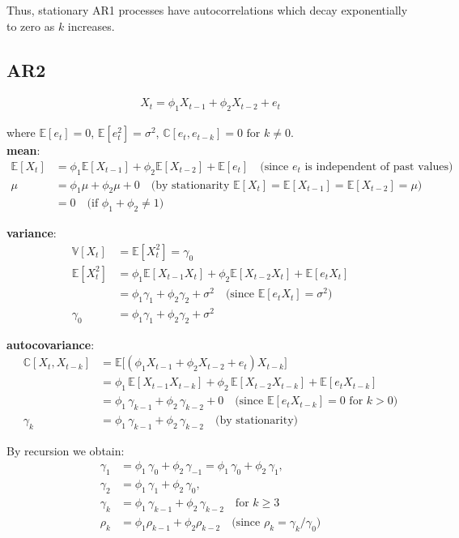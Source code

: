 \documentclass[docs/main.tex]{subfiles}
\begin{document}
Thus, stationary AR1 processes have autocorrelations which decay exponentially to zero as $k$ increases.


\subsection*{AR2}

\begin{align}
    X_t = \phi_1 X_{t-1} + \phi_2 X_{t-2} + e_t \label{eq:ar2-1}
\end{align}

where $\mathbb{E}[e_t] = 0$, $\mathbb{E}[e_t^2] = \sigma^2$, $\mathbb{C}[e_t, e_{t-k}] = 0\text{ for }k\ne0$.\\

\textbf{mean}:
\begin{align}
    \mathbb{E}[X_t] &= \phi_1\mathbb{E}[X_{t-1}] + \phi_2\mathbb{E}[X_{t-2}] + \mathbb{E}[e_t] \quad\text{(since $e_t$ is independent of past values)}\\
    \mu &= \phi_1 \mu + \phi_2 \mu + 0 \quad\text{(by stationarity $\mathbb{E}[X_t]=\mathbb{E}[X_{t-1}]
    =\mathbb{E}[X_{t-2}]=\mu$)}\\
    &= 0 \quad\text{(if $\phi_1+\phi_2\neq 1$)}
\end{align}

\textbf{variance}:
\begin{align}
    \mathbb{V}[X_t] &= \mathbb{E}[X_t^2] = \gamma_0\\
    \mathbb{E}[X_t^2] &= \phi_1 \mathbb{E}[X_{t-1}X_t] + \phi_2 \mathbb{E}[X_{t-2}X_t] + \mathbb{E}[e_tX_t]\\
    &= \phi_1 \gamma_1 + \phi_2 \gamma_2 + \sigma^2 \quad\text{(since $\mathbb{E}[e_tX_t]=\sigma^2$)}\\
    \gamma_0 &= \phi_1\gamma_1 + \phi_2\gamma_2 + \sigma^2
\end{align}

\textbf{autocovariance}:
\begin{align}
    \mathbb{C}[X_t, X_{t-k}] &= \mathbb{E}\Big[(\phi_1 X_{t-1} + \phi_2 X_{t-2} + e_t) X_{t-k}\Big] \\
    &= \phi_1\,\mathbb{E}[X_{t-1}X_{t-k}] + \phi_2\,\mathbb{E}[X_{t-2}X_{t-k}] + \mathbb{E}[e_tX_{t-k}]\\
    &= \phi_1\,\gamma_{k-1} + \phi_2\,\gamma_{k-2} + 0 \quad \text{(since $\mathbb{E}[e_tX_{t-k}] = 0$ for $k>0$)}\\
    \gamma_k &= \phi_1\,\gamma_{k-1} + \phi_2\,\gamma_{k-2} \quad \text{(by stationarity)}
\end{align}

By recursion we obtain:
\begin{align}
    \gamma_1 &= \phi_1\,\gamma_0 + \phi_2\,\gamma_{-1} = \phi_1\,\gamma_0 + \phi_2\,\gamma_1,\\[1em]
    \gamma_2 &= \phi_1\,\gamma_1 + \phi_2\,\gamma_0,\\[1em]
    \gamma_k &= \phi_1\,\gamma_{k-1} + \phi_2\,\gamma_{k-2} \quad \text{for } k\geq 3\\
    \rho_k &= \phi_1 \rho_{k-1} + \phi_2 \rho_{k-2} \quad \text{(since $\rho_k = \gamma_k / \gamma_0$)}
\end{align}
\end{document}
